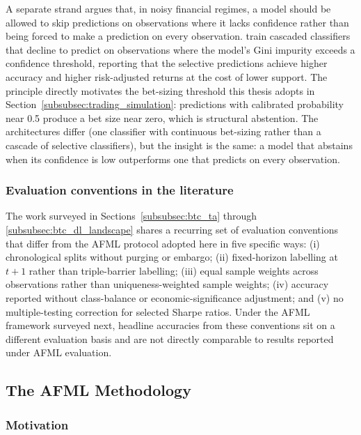 A separate strand argues that, in noisy financial regimes, a model should be allowed to skip predictions on observations where it lacks confidence rather than being forced to make a prediction on every observation. \citet{nabar_shroff_2023} train cascaded classifiers that decline to predict on observations where the model's Gini impurity exceeds a confidence threshold, reporting that the selective predictions achieve higher accuracy and higher risk-adjusted returns at the cost of lower support. The principle directly motivates the bet-sizing threshold this thesis adopts in Section~\ref{subsubsec:trading_simulation}: predictions with calibrated probability near 0.5 produce a bet size near zero, which is structural abstention. The architectures differ (one classifier with continuous bet-sizing rather than a cascade of selective classifiers), but the insight is the same: a model that abstains when its confidence is low outperforms one that predicts on every observation.


\subsubsection{Evaluation conventions in the literature}\label{subsubsec:btc_weaknesses}

The work surveyed in Sections~\ref{subsubsec:btc_ta} through \ref{subsubsec:btc_dl_landscape} shares a recurring set of evaluation conventions that differ from the AFML protocol adopted here in five specific ways: (i) chronological splits without purging or embargo; (ii) fixed-horizon labelling at $t+1$ rather than triple-barrier labelling; (iii) equal sample weights across observations rather than uniqueness-weighted sample weights; (iv) accuracy reported without class-balance or economic-significance adjustment; and (v) no multiple-testing correction for selected Sharpe ratios. Under the AFML framework surveyed next, headline accuracies from these conventions sit on a different evaluation basis and are not directly comparable to results reported under AFML evaluation.


\subsection{The AFML Methodology}\label{subsec:lit_afml}

\subsubsection{Motivation}\label{subsubsec:afml_motivation}

